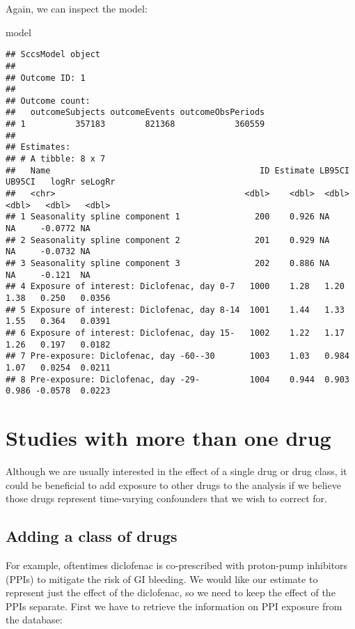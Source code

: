 \documentclass[
]{article}
\newenvironment{Shaded}{\begin{snugshade}}{\end{snugshade}}
\newcommand{\NormalTok}[1]{#1}
\begin{document}
Again, we can inspect the model:

\begin{Shaded}
\begin{Highlighting}[]
\NormalTok{model}
\end{Highlighting}
\end{Shaded}

\begin{verbatim}
## SccsModel object
## 
## Outcome ID: 1
## 
## Outcome count:
##   outcomeSubjects outcomeEvents outcomeObsPeriods
## 1          357183        821368            360559
## 
## Estimates:
## # A tibble: 8 x 7
##   Name                                          ID Estimate LB95CI UB95CI   logRr seLogRr
##   <chr>                                      <dbl>    <dbl>  <dbl>  <dbl>   <dbl>   <dbl>
## 1 Seasonality spline component 1               200    0.926 NA     NA     -0.0772 NA     
## 2 Seasonality spline component 2               201    0.929 NA     NA     -0.0732 NA     
## 3 Seasonality spline component 3               202    0.886 NA     NA     -0.121  NA     
## 4 Exposure of interest: Diclofenac, day 0-7   1000    1.28   1.20   1.38   0.250   0.0356
## 5 Exposure of interest: Diclofenac, day 8-14  1001    1.44   1.33   1.55   0.364   0.0391
## 6 Exposure of interest: Diclofenac, day 15-   1002    1.22   1.17   1.26   0.197   0.0182
## 7 Pre-exposure: Diclofenac, day -60--30       1003    1.03   0.984  1.07   0.0254  0.0211
## 8 Pre-exposure: Diclofenac, day -29-          1004    0.944  0.903  0.986 -0.0578  0.0223
\end{verbatim}

\hypertarget{studies-with-more-than-one-drug}{%
\section{Studies with more than one
drug}\label{studies-with-more-than-one-drug}}

Although we are usually interested in the effect of a single drug or
drug class, it could be beneficial to add exposure to other drugs to the
analysis if we believe those drugs represent time-varying confounders
that we wish to correct for.

\hypertarget{adding-a-class-of-drugs}{%
\subsection{Adding a class of drugs}\label{adding-a-class-of-drugs}}

For example, oftentimes diclofenac is co-prescribed with proton-pump
inhibitors (PPIs) to mitigate the risk of GI bleeding. We would like our
estimate to represent just the effect of the diclofenac, so we need to
keep the effect of the PPIs separate. First we have to retrieve the
information on PPI exposure from the database:
\end{document}
